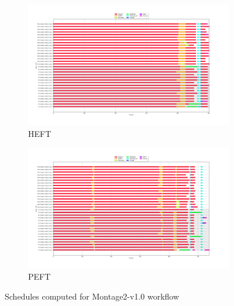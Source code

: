\begin{figure}[H]
\begin{subfigure}{1.0\textwidth}
\centering
\includegraphics[width=1\linewidth]{figures/5-2-montage10_heft.png}
\caption[Schedules computed for Montage2-v1.0 workflow - HEFT]{HEFT}
\label{fig:setup-input:m10:heft}
\end{subfigure}
\begin{subfigure}{1.0\textwidth}
\centering
\includegraphics[width=1\linewidth]{figures/5-2-montage10_peft.png}
\caption[Schedules computed for Montage2-v1.0 workflow - PEFT]{PEFT}
\label{fig:setup-input:m10:peft}
\end{subfigure}
\centering
\caption[Schedules computed for Montage2-v1.0 workflow]{Schedules computed for Montage2-v1.0 workflow}
\label{fig:setup-input:m10}
\end{figure}


